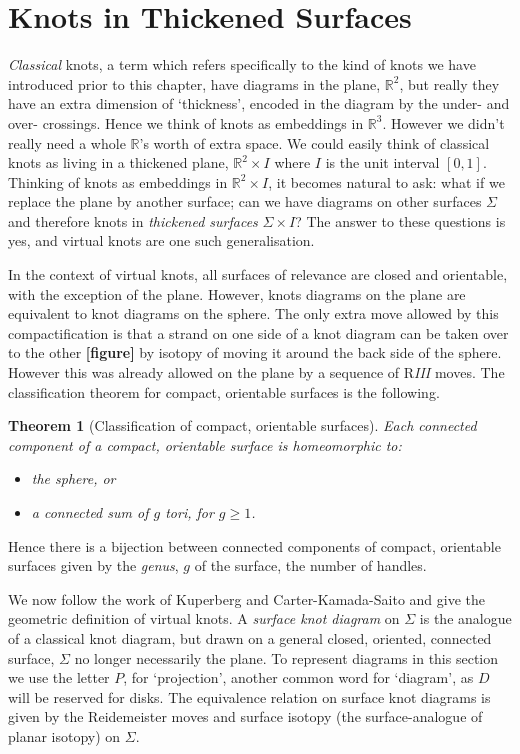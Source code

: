 \documentclass[12pt]{report}
\newcommand{\R}{\mathbb{R}}
\newcommand{\notered}[1]{{\color{Red} \textbf{#1}}}
\newtheorem*{theorem}{Theorem}
\begin{document}
\section{Knots in Thickened Surfaces}

\textit{Classical} knots, a term which refers specifically to the kind of knots we have introduced prior to this chapter, have diagrams in the plane, $\R^{2}$, but really they have an extra dimension of `thickness', encoded in the diagram by the under- and over- crossings. Hence we think of knots as embeddings in $\R^{3}$. However we didn't really need a whole $\R$'s worth of extra space. We could easily think of classical knots as living in a thickened plane, $\R^{2} \times I$ where $I$ is the unit interval $[0, 1]$. Thinking of knots as embeddings in $\R^{2} \times I$, it becomes natural to ask: what if we replace the plane by another surface; can we have diagrams on other surfaces $\Sigma$ and therefore knots in \textit{thickened surfaces} $\Sigma \times I$? The answer to these questions is yes, and virtual knots are one such generalisation.

In the context of virtual knots, all surfaces of relevance are closed and orientable, with the exception of the plane. However, knots diagrams on the plane are equivalent to knot diagrams on the sphere. The only extra move allowed by this compactification is that a strand on one side of a knot diagram can be taken over to the other \notered{[figure]} by isotopy of moving it around the back side of the sphere. However this was already allowed on the plane by a sequence of R\textit{III} moves.  The classification theorem for compact, orientable surfaces is the following.

\begin{theorem}[Classification of compact, orientable surfaces]
Each connected component of a compact, orientable surface is homeomorphic to:
\begin{itemize}
	\item the sphere, or
	\item a connected sum of $g$ tori, for $g \geq 1$.
\end{itemize}
\end{theorem}
Hence there is a bijection between connected components of compact, orientable surfaces given by the \textit{genus}, $g$ of the surface, the number of handles.

We now follow the work of Kuperberg \cite{what-is-a-virtual-link} and Carter-Kamada-Saito \cite{stable-equivalence-virtual-cobordisms} and give the geometric definition of virtual knots. A \textit{surface knot diagram} on $\Sigma$ is the analogue of a classical knot diagram, but drawn on a general closed, oriented, connected surface, $\Sigma$ no longer necessarily the plane. To represent diagrams in this section we use the letter $P$, for `projection', another common word for `diagram', as $D$ will be reserved for disks. The equivalence relation on surface knot diagrams is given by the Reidemeister moves and surface isotopy (the surface-analogue of planar isotopy) on $\Sigma$.
\end{document}
